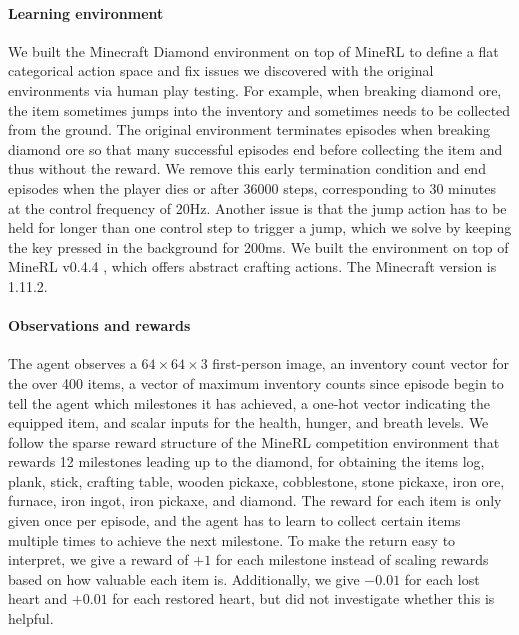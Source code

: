 \paragraph{Learning environment}
We built the Minecraft Diamond environment on top of MineRL to define a flat categorical action space and fix issues we discovered with the original environments via human play testing.
For example, when breaking diamond ore, the item sometimes jumps into the inventory and sometimes needs to be collected from the ground.
The original environment terminates episodes when breaking diamond ore so that many successful episodes end before collecting the item and thus without the reward.
We remove this early termination condition and end episodes when the player dies or after 36000 steps, corresponding to 30 minutes at the control frequency of 20Hz.
Another issue is that the jump action has to be held for longer than one control step to trigger a jump, which we solve by keeping the key pressed in the background for 200ms.
We built the environment on top of MineRL v0.4.4 \citep{guss2019minerl}, which offers abstract crafting actions. The Minecraft version is 1.11.2.

\paragraph{Observations and rewards}
The agent observes a $64\times64\times3$ first-person image, an inventory count vector for the over 400 items, a vector of maximum inventory counts since episode begin to tell the agent which milestones it has achieved, a one-hot vector indicating the equipped item, and scalar inputs for the health, hunger, and breath levels.
We follow the sparse reward structure of the MineRL competition environment\citep{guss2019minerl} that rewards 12 milestones leading up to the diamond, for obtaining the items log, plank, stick, crafting table, wooden pickaxe, cobblestone, stone pickaxe, iron ore, furnace, iron ingot, iron pickaxe, and diamond.
The reward for each item is only given once per episode, and the agent has to learn to collect certain items multiple times to achieve the next milestone.
To make the return easy to interpret, we give a reward of $+1$ for each milestone instead of scaling rewards based on how valuable each item is.
Additionally, we give $-0.01$ for each lost heart and $+0.01$ for each restored heart, but did not investigate whether this is helpful.
